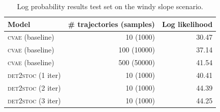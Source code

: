 \documentclass{kththesis}
\newcommand{\cvae}{\textsc{cvae}}
\newcommand{\dettostoc}{\textsc{det2stoc}}
\newcommand{\ra}[1]{\renewcommand{\arraystretch}{#1}}
\begin{document}
\begin{table}
\ra{1.3}
\centering
\begin{tabular}{lrr}
\toprule
Model & \# trajectories (samples) & Log likelihood  \\
\midrule
\cvae{} (baseline) & 10 (1000) & 30.47\\
\cvae{} (baseline) & 100 (10000) & 37.14 \\
\cvae{} (baseline) & 500 (50000) & 41.54 \\

\dettostoc{} (1 iter) & 10 (1000) & 40.41\\
\dettostoc{} (2 iter) & 10 (1000) & 44.39\\
\dettostoc{} (3 iter) & 10 (1000) & 44.25\\
\bottomrule
\end{tabular}
\caption{Log probability results test set on the windy slope scenario.}
\label{fig:windyslope_logprob}
\end{table}
\end{document}
